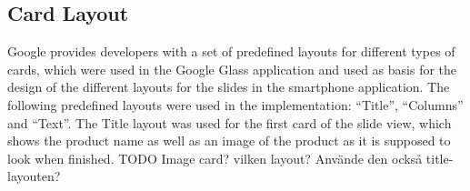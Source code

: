 

\subsection{Card Layout}
Google provides developers with a set of predefined layouts for different types of cards, which were used in the Google Glass application and used as basis for the design of the different layouts for the slides in the smartphone application. The following predefined layouts were used in the implementation: ``Title'', ``Columns'' and ``Text''. The Title layout was used for the first card of the slide view, which shows the product name as well as an image of the product as it is supposed to look when finished. TODO Image card? vilken layout? Använde den också title- layouten?

